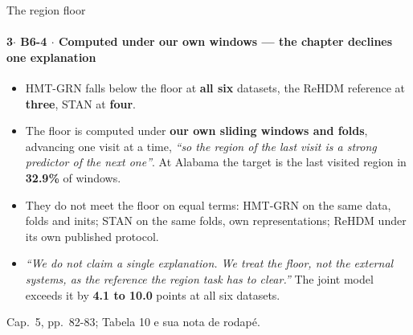 \documentclass{beamer}
\begin{document}
\begin{frame}[noframenumbering]{The region floor}
    \framesubtitle{\normalsize 3$\cdot$ \textbf{B6-4} $\cdot$ Computed under our own windows — the chapter declines one explanation}
    \hypertarget{b64}{}
    \small\begin{itemize}\setlength{\itemsep}{0pt}\setlength{\parskip}{0pt}
        \item HMT-GRN falls below the floor at \textbf{all six} datasets, the ReHDM reference at \textbf{three}, STAN at \textbf{four}.
        \item The floor is computed under \textbf{our own sliding windows and folds}, advancing one visit at a time, \textit{``so the region of the last visit is a strong predictor of the next one''}. At Alabama the target is the last visited region in \textbf{32.9\%} of windows.
        \item They do not meet the floor on equal terms: HMT-GRN on the same data, folds and inits; STAN on the same folds, own representations; ReHDM under its own published protocol.
        \item \textit{``We do not claim a single explanation. We treat the floor, not the external systems, as the reference the region task has to clear.''} The joint model exceeds it by \textbf{4.1 to 10.0} points at all six datasets.
    \end{itemize}
    \vfill
    {\scriptsize
    \begin{minipage}[b]{0.775\linewidth}\raggedright\textcolor{black!70}{Cap.~5, pp.~82-83; Tabela 10 e sua nota de rodapé.}\end{minipage}\hfill
    \begin{minipage}[b]{0.20\linewidth}\raggedleft \hyperlink{b0}{}\end{minipage}}
\end{frame}
\end{document}
